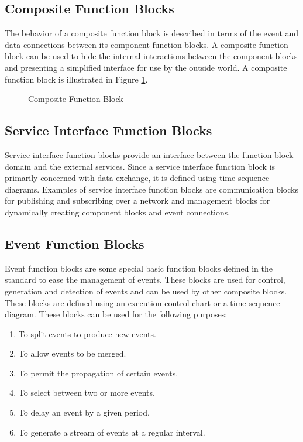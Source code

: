 \subsection*{Composite Function Blocks} 
The behavior of a composite function block is described in
terms of the event and data connections between its
component function blocks. A composite function block can be
used to hide the internal interactions between the component
blocks and presenting a simplified interface for use by the
outside world. A composite function block is illustrated in
Figure \ref{f:Composite_Block}.

\begin{figure}
  \begin{center}
    \caption[Composite Function Block]
            {Composite Function Block{\protect ~\cite{iec:614991:2000}}} 
        \label{f:Composite_Block}
  \end{center}
\end{figure}

\subsection*{Service Interface Function Blocks} 
Service interface function blocks provide an interface
between the function block domain and the external services.
Since a service interface function block is primarily
concerned with data exchange, it is defined using time
sequence diagrams. Examples of service interface function
blocks are communication blocks for publishing and
subscribing over a network and management blocks for
dynamically creating component blocks and event connections.
  
\subsection*{Event Function Blocks} 
Event function blocks are some special basic function blocks
defined in the standard to ease the management of events.
These blocks are used for control, generation and detection
of events and can be used by other composite blocks. These
blocks are defined using an execution control chart or a
time sequence diagram. These blocks can be used for the
following purposes:
\begin{enumerate}
\item To split events to produce new events.
\item To allow events to be merged.
\item To permit the propagation of certain events.
\item To select between two or more events.
\item To delay an event by a given period.
\item To generate a stream of events at a regular interval.
\end{enumerate}




